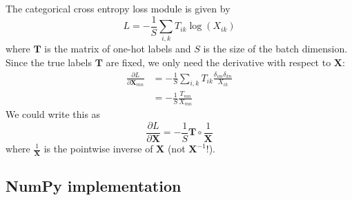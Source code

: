 \documentclass{article}
\newcommand{\pd}[2]{\frac{\partial #1}{\partial #2}}
\begin{document}
The categorical cross entropy loss module is given by
\[L = -\frac{1}{S}\sum_{i, k} T_{ik} \log(X_{ik})\]
where \(\bm T\) is the matrix of one-hot labels and \(S\) is the size of the batch dimension.
Since the true labels \(\bm T\) are fixed, we only need the derivative with respect to \(\bm X\):
\begin{align*}
  \pd{L}{\bm X_{mn}} &= -\frac{1}{S}\sum_{i, k} T_{ik} \frac{\delta_{im}\delta_{kn}}{X_{ik}}\\
  &= -\frac{1}{S} \frac{T_{mn}}{X_{mn}}
\end{align*}
We could write this as
\[\pd{L}{\bm X} = - \frac{1}{S} \bm T \circ \frac{1}{\bm X}\]
where \(\frac{1}{\bm X}\) is the pointwise inverse of \(\bm X\) (not \(\bm X^{-1}\)!).

\subsection{NumPy implementation}
\end{document}

